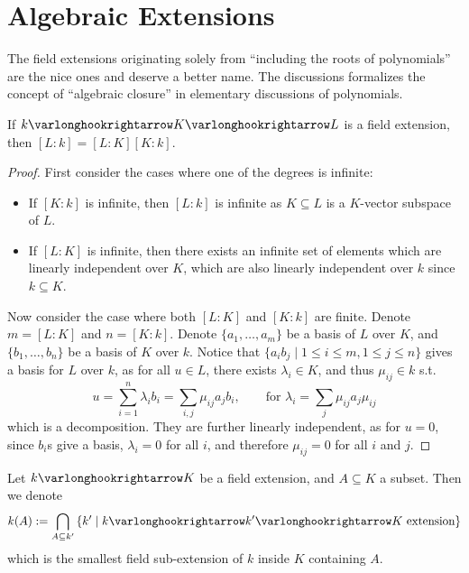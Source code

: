 \documentclass{article}
\begin{document}
\section{Algebraic Extensions}

\textstart
The field extensions originating solely from ``including the roots of polynomials'' are the nice ones and deserve a better name. The discussions formalizes the concept of ``algebraic closure'' in elementary discussions of polynomials.

\begin{proposition}\label{prop: degree of composition of field extensions}
    If $k \ext K \ext L$ is a field extension, then $[L:k] = [L:K][K:k]$.
\end{proposition}

\begin{proof}
    First consider the cases where one of the degrees is infinite: 
    \begin{itemize}
        \item If $[K : k]$ is infinite, then $[L : k]$ is infinite as $K \subseteq L$ is a $K$-vector subspace of $L$. 
        \item If $[L : K]$ is infinite, then there exists an infinite set of elements which are linearly independent over $K$, which are also linearly independent over $k$ since $k \subseteq K$.
    \end{itemize}
    Now consider the case where both $[L:K]$ and $[K:k]$ are finite. Denote $m = [L:K]$ and $n = [K:k]$. Denote $\{a_1, \dots, a_m\}$ be a basis of $L$ over $K$, and $\{b_1, \dots, b_n\}$ be a basis of $K$ over $k$. Notice that $\{a_i b_j \mid 1 \leq i \leq m, 1 \leq j \leq n\}$ gives a basis for $L$ over $k$, as for all $u \in L$, there exists $\lambda_i \in K$, and thus $\mu_{ij} \in k$ s.t.
    \[
        u = \sum_{i = 1}^n \lambda_i b_i = \sum_{i, j} \mu_{ij} a_j b_i, \qquad \text{for $\lambda_i = \sum_{j} \mu_{ij} a_j \mu_{ij}$}
    \]
    which is a decomposition. They are further linearly independent, as for $u = 0$, since $b_i$s give a basis, $\lambda_i = 0$ for all $i$, and therefore $\mu_{ij} = 0$ for all $i$ and $j$.
\end{proof}

\begin{notation}\label{not: extending field by field}
    Let $k \ext K$ be a field extension, and $A \subseteq K$ a subset. Then we denote
    \[
        k(A) := \bigcap_{A \subseteq k'} \left\{ k' \mid k \ext k' \ext K \text{ extension} \right\}
    \]
    which is the smallest field sub-extension of $k$ inside $K$ containing $A$. 
\end{notation}
\end{document}
